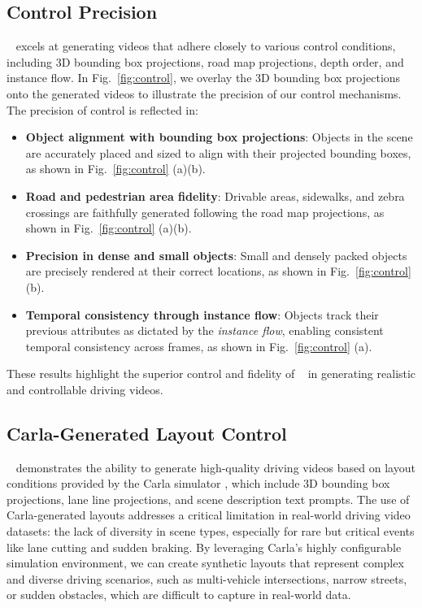 \subsection{Control Precision}
\label{app:control}
\titleDef~ excels at generating videos that adhere closely to various control conditions, including 3D bounding box projections, road map projections, depth order, and instance flow.  
In Fig.~\ref{fig:control}, we overlay the 3D bounding box projections onto the generated videos to illustrate the precision of our control mechanisms.  The precision of control is reflected in:  
\begin{itemize}
    \item \textbf{Object alignment with bounding box projections}: Objects in the scene are accurately placed and sized to align with their projected bounding boxes, as shown in  Fig.~\ref{fig:control} (a)(b).  
    \item \textbf{Road and pedestrian area fidelity}: Drivable areas, sidewalks, and zebra crossings are faithfully generated following the road map projections, as shown in  Fig.~\ref{fig:control} (a)(b).  
    \item \textbf{Precision in dense and small objects}: Small and densely packed objects are precisely rendered at their correct locations, as shown in  Fig.~\ref{fig:control} (b).  
    \item \textbf{Temporal consistency through instance flow}: Objects track their previous attributes as dictated by the \textit{instance flow}, enabling consistent temporal consistency across frames, as shown in  Fig.~\ref{fig:control} (a).  
\end{itemize}
These results highlight the superior control and fidelity of \titleDef~ in generating realistic and controllable driving videos.






\subsection{Carla-Generated Layout Control}  
\label{app:carla}
\titleDef~ demonstrates the ability to generate high-quality driving videos based on layout conditions provided by the Carla simulator \cite{Dosovitskiy17}, which include 3D bounding box projections, lane line projections, and scene description text prompts. 
The use of Carla-generated layouts addresses a critical limitation in real-world driving video datasets: the lack of diversity in scene types, especially for rare but critical events like lane cutting and sudden braking. 
By leveraging Carla's highly configurable simulation environment, we can create synthetic layouts that represent complex and diverse driving scenarios, such as multi-vehicle intersections, narrow streets, or sudden obstacles, which are difficult to capture in real-world data.  

